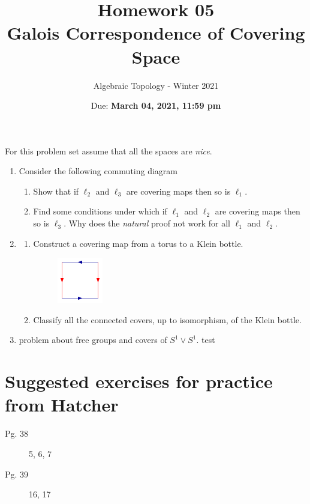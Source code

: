 \documentclass{article}
\title{Homework 05 \\ Galois Correspondence of Covering Space}
\author{Algebraic Topology - Winter 2021}
\date{Due: \textbf{March 04, 2021, 11:59 pm}}
\begin{document}
\maketitle

For this problem set assume that all the spaces are \textit{nice}.
\begin{enumerate}
\item 
  Consider the following commuting diagram
  \begin{center}
  \end{center}
  \begin{enumerate}
  \item Show that if $\ell_2$ and $\ell_3$ are covering maps then so is $\ell_1$. 
  \item Find some conditions under which if $\ell_1$ and $\ell_2$ are covering
    maps then so is $\ell_3$. Why does the \textit{natural} proof not work for all  $\ell_1$ and $\ell_2$.
  \end{enumerate}
\item 
  \begin{enumerate}
  \item Construct a covering map from a torus to a Klein bottle.
    \begin{figure}[h]
      \centering
      \includegraphics[width=75]{images/klein-bottle.png} 
      \label{fig:klein_bottle}
    \end{figure}
  \item Classify all the connected covers, up to isomorphism, of the Klein bottle.
  \end{enumerate}
\item problem about free groups and covers of $S^1 \vee S^1$. 
  test
\end{enumerate}


\section*{Suggested exercises for practice from Hatcher}

\begin{description}
    \item[Pg. 38] 5, 6, 7
    \item[Pg. 39] 16, 17
\end{description}
\end{document}
